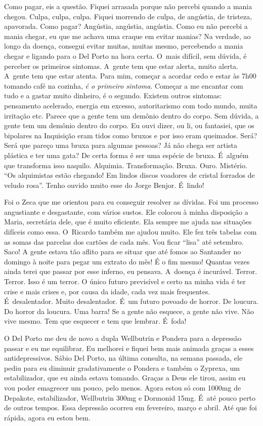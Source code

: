 Como pagar, eis a questão. Fiquei arrasada porque não percebi quando a
mania chegou. Culpa, culpa, culpa. Fiquei morrendo de culpa, de
angústia, de tristeza, apavorada. Como pagar? Angústia, angústia,
angústia. Como eu não percebi a mania chegar, eu que me achava uma
craque em evitar manias? Na verdade, ao longo da doença, consegui evitar
muitas, muitas mesmo, percebendo a mania chegar e ligando para o Del
Porto na hora certa. O~mais difícil, sem dúvida, é perceber os primeiros
sintomas. A~gente tem que estar alerta, muito alerta. A~gente tem que
estar atenta. Para mim, começar a acordar cedo e estar às 7h00 tomando
café na cozinha, \emph{é o primeiro sintoma}. Começar a me encantar com
tudo e a gastar muito dinheiro, é o segundo. Existem outros sintomas:
pensamento acelerado, energia em excesso, autoritarismo com todo mundo,
muita irritação etc. Parece que a gente tem um demônio dentro do corpo.
Sem dúvida, a gente tem um demônio dentro do corpo. Eu ouvi dizer, ou
li, ou fantasiei, que os bipolares na Inquisição eram tidos como bruxos
e por isso eram queimados. Será? Será que pareço uma bruxa para algumas
pessoas? Já não chega ser artista plástica e ter uma gata? De certa
forma é ser uma espécie de bruxa. É~alguém que transforma isso naquilo.
Alquimia. Transformação. Bruxa. Ouro. Mistério. ``Os alquimistas estão
chegando! Em lindos discos voadores de cristal forrados de veludo
rosa''. Tenho ouvido muito esse  do Jorge Benjor. É~lindo!

Foi o Zeca que me orientou para eu conseguir resolver as dívidas. Foi um
processo angustiante e desgastante, com vários sustos. Ele colocou à
minha disposição a Maria, secretária dele, que é muito eficiente. Ela
sempre me ajuda nas situações difíceis como essa. O~Ricardo também me
ajudou muito. Ele fez três tabelas com as somas das parcelas dos cartões
de cada mês. Vou ficar ``lisa'' até setembro. Saco! A gente estava tão
aflito para se situar que até fomos ao Santander no domingo à noite para
pegar um extrato do mês! É o fim mesmo! Quantas vezes ainda terei que
passar por esse inferno, eu pensava. A~doença é incurável. Terror.
Terror. Isso é um terror. O único futuro previsível e certo na minha
vida é ter crise e mais crises e, por causa da idade, cada vez mais
frequentes. É~desalentador. Muito desalentador. É~um futuro povoado de
horror. De loucura. Do horror da loucura. Uma barra! Se a gente não
esquece, a gente não vive. Não vive mesmo. Tem que esquecer e tem que
lembrar. É~foda!

O Del Porto me deu de novo a dupla Wellbutrin e Pondera para a depressão
passar e eu me equilibrar. Eu melhorei e fiquei bem mais animada graças
a esses antidepressivos. Sábio Del Porto, na última consulta, na semana
passada, ele pediu para eu diminuir gradativamente o Pondera e também o
Zyprexa, um estabilizador, que eu ainda estava tomando. Graças a Deus
ele tirou, assim eu vou poder emagrecer um pouco, pelo menos. Agora
estou só com 1000mg de Depakote, estabilizador, Wellbutrin 300mg e
Dormonid 15mg. É~até pouco perto de outros tempos. Essa depressão
ocorreu em fevereiro, março e abril. Até que foi rápida, agora eu estou
bem.

